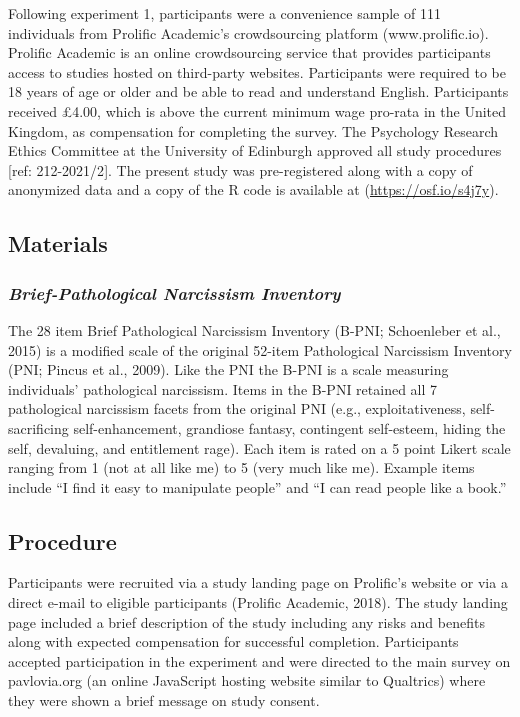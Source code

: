 \documentclass[
  donotrepeattitle,doc, 12pt, a4paper,floatsintext]{apa7}
\begin{document}
Following experiment 1, participants were a convenience sample of 111 individuals from Prolific Academic's crowdsourcing platform (www.prolific.io). Prolific Academic is an online crowdsourcing service that provides participants access to studies hosted on third-party websites. Participants were required to be 18 years of age or older and be able to read and understand English. Participants received £4.00, which is above the current minimum wage pro-rata in the United Kingdom, as compensation for completing the survey. The Psychology Research Ethics Committee at the University of Edinburgh approved all study procedures {[}ref: 212-2021/2{]}. The present study was pre-registered along with a copy of anonymized data and a copy of the R code is available at (\url{https://osf.io/s4j7y}).

\hypertarget{materials-2}{%
\subsection{Materials}\label{materials-2}}

\hypertarget{brief-pathological-narcissism-inventory-1}{%
\subsubsection{\texorpdfstring{\emph{Brief-Pathological Narcissism Inventory}}{Brief-Pathological Narcissism Inventory}}\label{brief-pathological-narcissism-inventory-1}}

The 28 item Brief Pathological Narcissism Inventory (B-PNI; Schoenleber et al., 2015) is a modified scale of the original 52-item Pathological Narcissism Inventory (PNI; Pincus et al., 2009). Like the PNI the B-PNI is a scale measuring individuals' pathological narcissism. Items in the B-PNI retained all 7 pathological narcissism facets from the original PNI (e.g., exploitativeness, self-sacrificing self-enhancement, grandiose fantasy, contingent self-esteem, hiding the self, devaluing, and entitlement rage). Each item is rated on a 5 point Likert scale ranging from 1 (not at all like me) to 5 (very much like me). Example items include ``I find it easy to manipulate people'' and ``I can read people like a book.''

\hypertarget{procedure-3}{%
\subsection{Procedure}\label{procedure-3}}

Participants were recruited via a study landing page on Prolific's website or via a direct e-mail to eligible participants (Prolific Academic, 2018). The study landing page included a brief description of the study including any risks and benefits along with expected compensation for successful completion. Participants accepted participation in the experiment and were directed to the main survey on pavlovia.org (an online JavaScript hosting website similar to Qualtrics) where they were shown a brief message on study consent.
\end{document}
